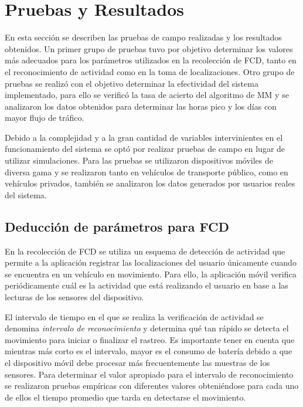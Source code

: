 \section{Pruebas y Resultados}
\label{sec:pruebas}

En esta sección se describen las pruebas de campo realizadas y los resultados obtenidos. Un primer grupo de pruebas tuvo por objetivo determinar los valores más adecuados para los parámetros utilizados en la recolección de FCD, tanto en el reconocimiento de actividad como en la toma de localizaciones. Otro grupo de pruebas se realizó con el objetivo determinar la efectividad del sistema implementado, para ello se verificó la tasa de acierto del algoritmo de MM y se analizaron los datos obtenidos para determinar las horas pico y los días con mayor flujo de tráfico.

Debido a la complejidad y a la gran cantidad de variables intervinientes en el funcionamiento del sistema se optó por realizar pruebas de campo en lugar de utilizar simulaciones. Para las pruebas se utilizaron dispositivos móviles de diversa gama y se realizaron tanto en vehículos de transporte público, como en vehículos privados, también se analizaron los datos generados por usuarios reales del sistema. 

\subsection{Deducción de parámetros para FCD}

En la recolección de FCD se utiliza un esquema de detección de actividad que permite a la aplicación registrar las localizaciones del usuario únicamente cuando se encuentra en un vehículo en movimiento. Para ello, la aplicación móvil verifica periódicamente cuál es la actividad que está realizando el usuario en base a las lecturas de los sensores del dispositivo. 

El intervalo de tiempo en el que se realiza la verificación de actividad se denomina \emph{intervalo de reconocimiento} y determina qué tan rápido se detecta el movimiento para iniciar o finalizar el rastreo. Es importante tener en cuenta que mientras más corto es el intervalo, mayor es el consumo de batería debido a que el dispositivo móvil debe procesar más frecuentemente las muestras de los sensores. Para determinar el valor apropiado para el intervalo de reconocimiento se realizaron pruebas empíricas con diferentes valores obteniéndose para cada uno de ellos el tiempo promedio que tarda en detectarse el movimiento. 

